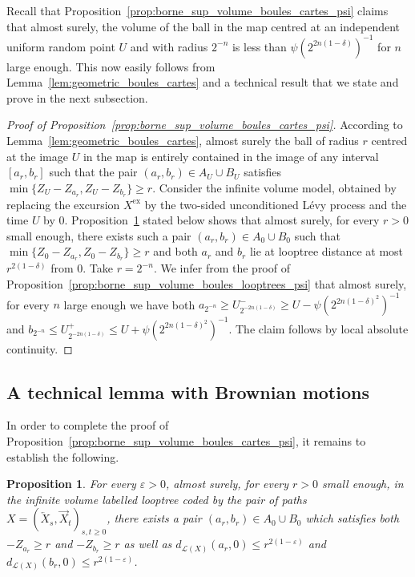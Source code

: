 \documentclass[british, a4paper,11pt]{article}
\numberwithin{equation}{section}
\newtheorem{prop}[thm]{Proposition}
\theoremstyle{definition}
\newcommand{\Loop}{\mathscr{L}}
\newcommand{\exc}{\mathrm{ex}}
\begin{document}
Recall that Proposition~\ref{prop:borne_sup_volume_boules_cartes_psi} claims that almost surely, the volume of the ball in the map centred at an independent uniform random point $U$ and with radius $2^{-n}$ is less than $\psi(2^{2n(1-\delta)})^{-1}$ for $n$ large enough.
This now easily follows from Lemma~\ref{lem:geometric_boules_cartes} and a technical result that we state and prove in the next subsection.


\begin{proof}[Proof of Proposition~\ref{prop:borne_sup_volume_boules_cartes_psi}]
According to Lemma~\ref{lem:geometric_boules_cartes}, almost surely the ball of radius $r$ centred at the image $U$ in the map is entirely contained in the image of any interval $[a_r, b_r]$ such that the pair $(a_r, b_r) \in A_U \cup B_U$ satisfies $\min\{Z_{U}-Z_{a_r}, Z_{U}-Z_{b_r}\} \geq r$.
Consider the infinite volume model, obtained by replacing the excursion $X^{\exc}$ by the two-sided unconditioned L\'evy process and the time $U$ by $0$. 
Proposition~\ref{prop:technique} stated below shows that almost surely, for every $r>0$ small enough, there exists such a pair $(a_r, b_r) \in A_0 \cup B_0$ such that $\min\{Z_{0}-Z_{a_r}, Z_{0}-Z_{b_r}\} \geq r$ and both $a_r$ and $b_r$ lie at looptree distance at most $r^{2(1-\delta)}$ from $0$.
Take $r=2^{-n}$. We infer from the proof of Proposition~\ref{prop:borne_sup_volume_boules_looptrees_psi}
that almost surely, for every $n$ large enough we have both 
$a_{2^{-n}} \ge U^-_{2^{-2n(1-\delta)}} \ge U-\psi(2^{2n(1-\delta)^2})^{-1}$
and
$b_{2^{-n}} \le U^+_{2^{-2n(1-\delta)}} \le U+\psi(2^{2n(1-\delta)^2})^{-1}$.
The claim follows by local absolute continuity.
\end{proof}






\subsection{A technical lemma with Brownian motions}
\label{sec:technique}


In order to complete the proof of Proposition~\ref{prop:borne_sup_volume_boules_cartes_psi}, it remains to establish the following.


\begin{prop}\label{prop:technique}
For every $\varepsilon > 0$, almost surely, for every $r>0$ small enough, in the infinite volume labelled looptree coded by the pair of paths $X = (\overleftarrow{X}_s, \overrightarrow{X}_t)_{s,t \geq 0}$, there exists a pair $(a_r, b_r) \in A_0 \cup B_0$ which satisfies both 
$-Z_{a_r} \geq r$ and $-Z_{b_r} \geq r$
as well as
$d_{\Loop(X)}(a_r, 0) \leq r^{2(1-\varepsilon)}$ and $d_{\Loop(X)}(b_r, 0) \leq r^{2(1-\varepsilon)}$.
\end{prop}
\end{document}
